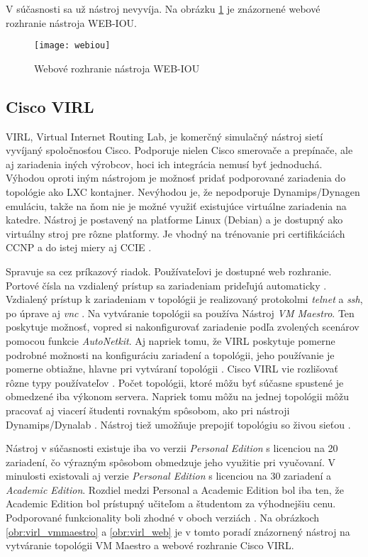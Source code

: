 V súčasnosti sa už nástroj nevyvíja. Na obrázku \ref{obr:webiou} je znázornené webové rozhranie nástroja WEB-IOU.

\begin{figure}
    \centering
    \texttt{[image: webiou]}
    \caption{Webové rozhranie nástroja WEB-IOU} \cite{obr_webiou}
    \label{obr:webiou}
\end{figure}

\subsection{Cisco VIRL}

VIRL, Virtual Internet Routing Lab, je komerčný simulačný nástroj sietí vyvíjaný spoločnosťou Cisco. Podporuje nielen Cisco smerovače a prepínače, ale aj zariadenia iných výrobcov, hoci ich integrácia nemusí byť jednoduchá. Výhodou oproti iným nástrojom je možnosť pridať podporované zariadenia do topológie ako LXC kontajner. Nevýhodou je, že nepodporuje Dynamips/Dynagen emuláciu, takže na ňom nie je možné využiť existujúce virtuálne zariadenia na katedre. Nástroj je postavený na platforme Linux (Debian) a je dostupný ako virtuálny stroj pre rôzne platformy. Je vhodný na trénovanie pri certifikáciách CCNP a do istej miery aj CCIE \cite{virl_cisco}. 

Spravuje sa cez príkazový riadok. Používateľovi je dostupné web rozhranie. Portové čísla na vzdialený prístup sa zariadeniam prideľujú automaticky \cite{virl_interfacett_1}. Vzdialený prístup k zariadeniam v topológii je realizovaný protokolmi \emph{telnet} a \emph{ssh}, po úprave aj \emph{vnc} \cite{virl_ciscoskills, virl_speaknetworks}. Na vytváranie topológii sa používa Nástroj \emph{VM Maestro}. Ten poskytuje možnosť, vopred si nakonfigurovať zariadenie podľa zvolených scenárov pomocou funkcie \emph{AutoNetkit}. Aj napriek tomu, že VIRL poskytuje pomerne podrobné možnosti na konfiguráciu zariadení a topológii, jeho používanie je pomerne obtiažne, hlavne pri vytváraní topológii \cite{virl_interfacett_1, virl_interfacett_2}. Cisco VIRL vie rozlišovať rôzne typy používateľov \cite{virl_cisco_features}. Počet topológii, ktoré môžu byť súčasne spustené je obmedzené iba výkonom servera. Napriek tomu môžu na jednej topológii môžu pracovať aj viacerí študenti rovnakým spôsobom, ako pri nástroji Dynamips/Dynalab \cite{virl_interfacett_2}. Nástroj tiež umožňuje prepojiť topológiu so živou sieťou \cite{virl_speaknetworks}. 

Nástroj v súčasnosti existuje iba vo verzii \emph{Personal Edition} s licenciou na 20 zariadení, čo výrazným spôsobom obmedzuje jeho využitie pri vyučovaní. V minulosti existovali aj verzie \emph{Personal Edition} s licenciou na 30 zariadení a \emph{Academic Edition}. Rozdiel medzi Personal a Academic Edition bol iba ten, že Academic Edition bol prístupný učiteľom a študentom za výhodnejšiu cenu. Podporované funkcionality boli zhodné v oboch verziách \cite{virl_edition_differences}. Na obrázkoch \ref{obr:virl_vmmaestro} a \ref{obr:virl_web} je v tomto poradí znázornený nástroj na vytváranie topológii VM Maestro a webové rozhranie Cisco VIRL.

